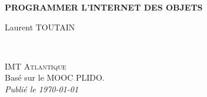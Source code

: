 \documentclass[11pt,fleqn]{book} %
\begin{document}
\let\cleardoublepage\clearpage


\begingroup
\thispagestyle{empty}
\centering
\vspace*{5cm}
\par\normalfont\fontsize{35}{35}\sffamily\selectfont
\textbf{PROGRAMMER L'INTERNET DES OBJETS }\\
{\LARGE }\par %
\vspace*{1cm}
{\Huge Laurent TOUTAIN}\par %
\endgroup


\newpage
~\vfill
\thispagestyle{empty}


\noindent \textsc{IMT Atlantique}\\

\noindent Basé sur le MOOC PLIDO.\\ %

\noindent \textit{Publié le \today} %




\pagestyle{empty} %

\renewcommand\contentsname{Table des Matières}
\renewcommand{\bibname}{Bibliographie}
\tableofcontents%


\pagestyle{fancy} %

\end{document}
